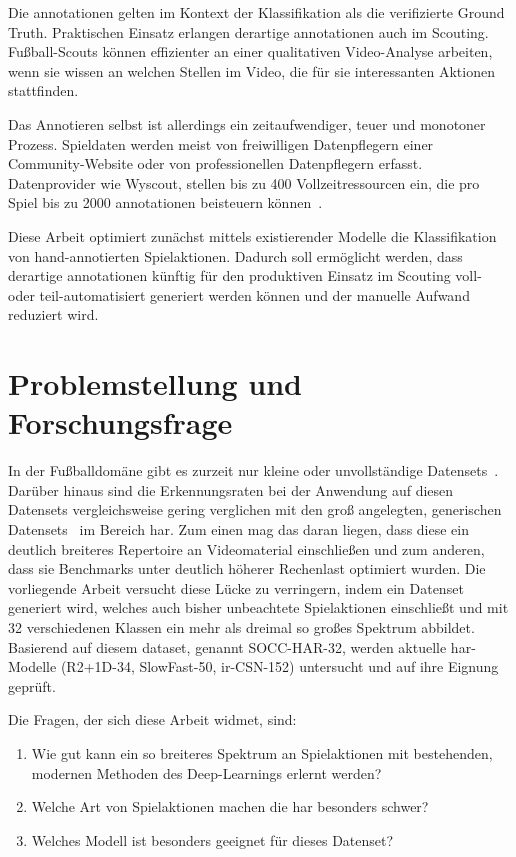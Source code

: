 Die \gls{annotationen} gelten im Kontext der Klassifikation als die \sog verifizierte Ground Truth.
Praktischen Einsatz erlangen derartige \gls{annotationen} auch im Scouting.
Fußball-Scouts können \zB effizienter an einer qualitativen Video-Analyse arbeiten, wenn sie wissen an welchen Stellen im Video, die für sie interessanten Aktionen stattfinden.

Das Annotieren selbst ist allerdings ein zeitaufwendiger, teuer und monotoner Prozess.
Spieldaten werden meist von freiwilligen Datenpflegern einer Community-Website oder von professionellen Datenpflegern erfasst.
Datenprovider wie Wyscout, stellen bis zu 400 Vollzeitressourcen ein, die pro Spiel bis zu 2000 \gls{annotationen} beisteuern können~\cite{Jiang19}.

Diese Arbeit optimiert zunächst mittels existierender Modelle die Klassifikation von hand-annotierten Spielaktionen.
Dadurch soll ermöglicht werden, dass derartige \gls{annotationen} künftig für den produktiven Einsatz im Scouting voll- oder teil-automatisiert generiert werden können und der manuelle Aufwand reduziert wird.

\section{Problemstellung und Forschungsfrage}
\label{sec:forschungsfrage}

In der Fußballdomäne gibt es zurzeit nur kleine oder unvollständige Datensets~\cite{Giancola18, Jiang19}.
Darüber hinaus sind die Erkennungsraten bei der Anwendung auf diesen Datensets vergleichsweise gering verglichen mit den groß angelegten, generischen Datensets~\cite{Kay17,Karpathy14} im Bereich \gls{har}.
Zum einen mag das daran liegen, dass diese ein deutlich breiteres Repertoire an Videomaterial einschließen und zum anderen, dass sie Benchmarks unter deutlich höherer Rechenlast optimiert wurden.
Die vorliegende Arbeit versucht diese Lücke zu verringern, indem ein Datenset generiert wird, welches auch bisher unbeachtete Spielaktionen einschließt und mit 32 verschiedenen Klassen ein mehr als dreimal so großes Spektrum abbildet.
Basierend auf diesem \gls{dataset}, genannt SOCC-HAR-32, werden aktuelle \gls{har}-Modelle (R2+1D-34, SlowFast-50, ir-CSN-152) untersucht und auf ihre Eignung geprüft.

Die Fragen, der sich diese Arbeit widmet, sind:
\begin{enumerate}
    \item Wie gut kann ein so breiteres Spektrum an Spielaktionen mit bestehenden, modernen Methoden des Deep-Learnings erlernt werden?
    \item Welche Art von Spielaktionen machen die \gls{har} besonders schwer?
    \item Welches Modell ist besonders geeignet für dieses Datenset?
\end{enumerate}

